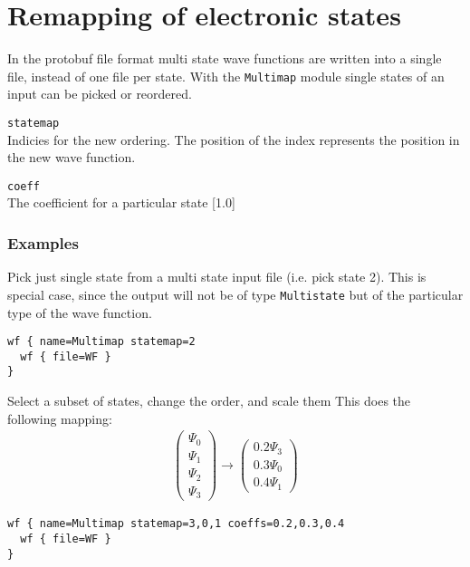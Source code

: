 \documentclass[a4paper,12pt]{scrbook}
\newcommand{\option}[2]{\item \texttt{#1}\\ #2}
\begin{document}
\section{Remapping of electronic states}
In the protobuf file format multi state wave functions are written into a single file,
instead of one file per state. With the \verb|Multimap| module single states of an input 
can be picked or reordered.

\begin{options}
 \option{statemap}{Indicies for the new ordering. The position of the index represents the position in the new wave function.}
 \option{coeff}{The coefficient for a particular state [1.0]}
\end{options}

\subsubsection*{Examples}
Pick just single state from a multi state input file (i.e. pick state 2). This is special case, since
the output will not be of type \verb|Multistate| but of the particular type of the wave function.
\begin{verbatim}
wf { name=Multimap statemap=2
  wf { file=WF }
}
\end{verbatim}

Select a  subset of states, change the order, and scale them This does the following mapping:
\begin{align}
\begin{pmatrix}
\Psi_0 \\ \Psi_1 \\ \Psi_2 \\ \Psi_3
\end{pmatrix}
\rightarrow
\begin{pmatrix}
0.2 \Psi_3 \\ 0.3 \Psi_0 \\ 0.4\Psi_1
\end{pmatrix}
\nonumber
\end{align}
\begin{verbatim}
wf { name=Multimap statemap=3,0,1 coeffs=0.2,0.3,0.4
  wf { file=WF }
}
\end{verbatim}




\end{document}
